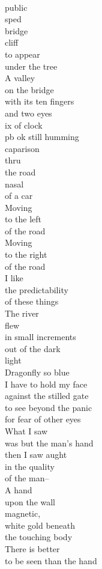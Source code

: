\documentclass[smalldemyvopaper,11pt,twoside,onecolumn,openright,extrafontsizes]{memoir}
\begin{document}
\\public
\\sped
\\bridge
\\cliff
\\to appear
\\under the tree
\\A valley
\\on the bridge
\\with its ten fingers
\\and two eyes
\\ix of clock
\\pb ok still humming
\\caparison
\\thru
\\the road
\\nasal
\\of a car
\\Moving
\\to the left
\\of the road
\\Moving
\\to the right
\\of the road
\\I like
\\the predictability
\\of these things
\\The river
\\flew
\\in small increments
\\out of the dark
\\light
\\Dragonfly so blue
\\I have to hold my face
\\against the stilled gate
\\to see beyond the panic
\\for fear of other eyes
\\What I saw
\\was but the man's hand
\\then I saw aught
\\in the quality
\\of the man--
\\A hand
\\upon the wall
\\magnetic,
\\white gold beneath
\\the touching body
\\There is better
\\to be seen than the hand
\end{document}
